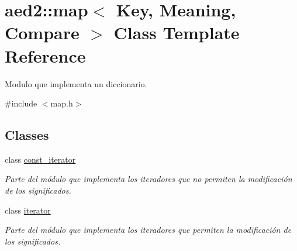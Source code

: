 \hypertarget{classaed2_1_1map}{}\section{aed2\+:\+:map$<$ Key, Meaning, Compare $>$ Class Template Reference}
\label{classaed2_1_1map}


Modulo que implementa un diccionario.  




{\ttfamily \#include $<$map.\+h$>$}

\subsection*{Classes}
\begin{DoxyCompactItemize}
\item 
class \hyperlink{classaed2_1_1map_1_1const__iterator}{const\+\_\+iterator}
\begin{DoxyCompactList}\small\item\em Parte del módulo que implementa los iteradores que no permiten la modificación de los significados. \end{DoxyCompactList}\item 
class \hyperlink{classaed2_1_1map_1_1iterator}{iterator}
\begin{DoxyCompactList}\small\item\em Parte del módulo que implementa los iteradores que permiten la modificación de los significados. \end{DoxyCompactList}\end{DoxyCompactItemize}
